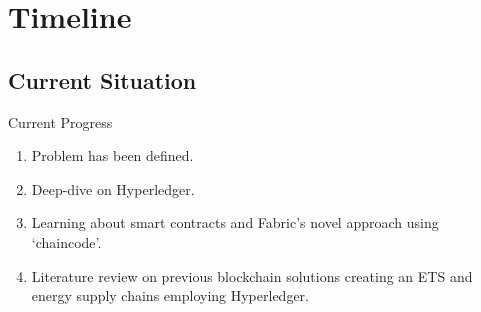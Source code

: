 \section{Timeline}
\subsection{Current Situation}
\begin{frame}{Current Progress}
    \begin{enumerate}
        \item Problem has been defined.
        \item Deep-dive on Hyperledger.
        \item Learning about smart contracts and Fabric's novel approach
              using `chaincode'.
        \item Literature review on previous blockchain solutions creating
              an ETS and energy supply chains employing Hyperledger.
    \end{enumerate}
\end{frame}
